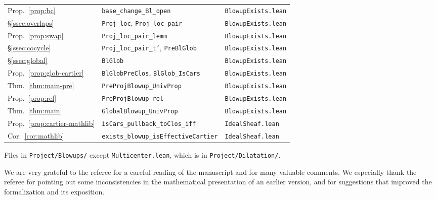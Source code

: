 \documentclass[pdflatex,sn-mathphys-num]{sn-jnl}
\theoremstyle{plain}
\theoremstyle{definition}
\begin{document}
\begin{center}
\begin{tabular}{@{}lll@{}}
Prop.\ \ref{prop:bc} & \texttt{base\_change\_Bl\_open} & \texttt{BlowupExists.lean} \\
\S\ref{ssec:overlaps} & \texttt{Proj\_loc}, \texttt{Proj\_loc\_pair} & \texttt{BlowupExists.lean} \\
Prop.\ \ref{prop:swap} & \texttt{Proj\_loc\_pair\_lemm} & \texttt{BlowupExists.lean} \\
\S\ref{ssec:cocycle} & \texttt{Proj\_loc\_pair\_t'}, \texttt{PreBlGlob} & \texttt{BlowupExists.lean} \\
\S\ref{ssec:global} & \texttt{BlGlob} & \texttt{BlowupExists.lean} \\
Prop.\ \ref{prop:glob-cartier} & \texttt{BlGlobPreClos}, \texttt{BlGlob\_IsCars} & \texttt{BlowupExists.lean} \\
Thm.\ \ref{thm:main-pre} & \texttt{PreProjBlowup\_UnivProp} & \texttt{BlowupExists.lean} \\
Prop.\ \ref{prop:rel} & \texttt{PreProjBlowup\_rel} & \texttt{BlowupExists.lean} \\
Thm.\ \ref{thm:main} & \texttt{GlobalBlowup\_UnivProp} & \texttt{BlowupExists.lean} \\
Prop.\ \ref{prop:cartier-mathlib} & \texttt{isCars\_pullback\_toClos\_iff} & \texttt{IdealSheaf.lean} \\
Cor.\ \ref{cor:mathlib} & \texttt{exists\_blowup\_isEffectiveCartier} & \texttt{IdealSheaf.lean} \\
\hline
\end{tabular}
\end{center}

\noindent
Files in \texttt{Project/Blowups/} except \texttt{Multicenter.lean}, which is in
\texttt{Project/Dilatation/}.

We are very grateful to the referee for a careful reading of the manuscript and
for many valuable comments. We especially thank the referee for pointing out
some inconsistencies in the mathematical presentation of an earlier version, and for suggestions
that improved the formalization and its exposition.
\end{document}

